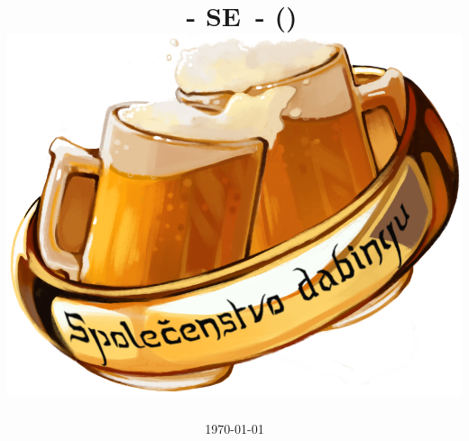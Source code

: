 \documentclass[twoside, a4paper, 10pt]{article}
\begin{document}


\def\mytitle{%
    \myanime\ - S\myserie E\myepisode\ - \myepisodename
    \ifx\mytimes\empty
    \else
        \space(\mytimes)
    \fi
    \vspace{10px}
}
\title{\Large{\mytitle}\\ \includegraphics[scale=0.5]{imgs/logo.png}}
\author{\myauthor}
\date{\today}

\maketitle
\thispagestyle{empty}


\newpage

\setcounter{page}{1}

\begin{tabularx}{\textwidth}{rcX}
    
    
    
\end{tabularx}
    
\end{document}
